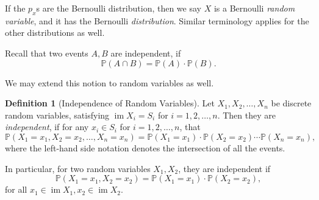 \documentclass[11pt]{article}
\numberwithin{equation}{section}
\theoremstyle{definition}
\newtheorem{definition}[theorem]{Definition}
\theoremstyle{remark}
\newcommand{\pqty}[1]{\left(#1\right)}
\newcommand{\Prob}{\mathbb P}
\DeclareMathOperator{\img}{im}
\begin{document}
If the \(p_x\)s are the Bernoulli distribution, then we say \(X\) is a Bernoulli \emph{random variable}, and it has the Bernoulli \emph{distribution}. Similar terminology applies for the other distributions as well.

Recall that two events \(A, B\) are independent, if
\[
    \Prob \pqty{A \cap B} = \Prob\pqty{A} \cdot \Prob\pqty{B}.
\]

We may extend this notion to random variables as well.

\begin{definition}[Independence of Random Variables]\label{probability-definition-022}
    \label{probability-def:independence-random-variable}%
    Let \(X_1, X_2, \ldots, X_n\) be discrete random variables, satisfying \(\img X_i = S_i\) for \(i = 1, 2, \ldots, n\). Then they are \emph{independent}, if for any \(x_i \in S_i\) for \(i = 1, 2, \ldots, n\), that
    \[
        \Prob\pqty{X_1 = x_1, X_2 = x_2, \ldots, X_n = x_n} = \Prob\pqty{X_1 = x_1} \cdot \Prob\pqty{X_2 = x_2} \cdots \Prob\pqty{X_n = x_n},
    \]
    where the left-hand side notation denotes the intersection of all the events.
\end{definition}

In particular, for two random variables \(X_1, X_2\), they are independent if
\[
    \Prob\pqty{X_1 = x_1, X_2 = x_2} = \Prob\pqty{X_1 = x_1} \cdot \Prob\pqty{X_2 = x_2},
\]
for all \(x_1 \in \img X_1, x_2 \in \img X_2\).
\end{document}
